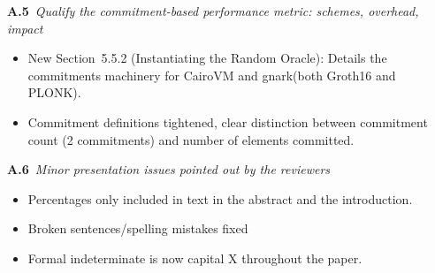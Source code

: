 \documentclass[10pt,a4paper]{article}
\newcommand{\req}[2][]{\begin{reqbox}\textbf{#1}\itshape\ #2\end{reqbox}}
\begin{document}
\req[A.5]{Qualify the commitment-based performance metric: schemes, overhead, impact}
\begin{itemize}
\item New Section~5.5.2 (Instantiating the Random Oracle): Details the commitments machinery for CairoVM and gnark(both Groth16 and PLONK).
\item Commitment definitions tightened, clear distinction between commitment count (2 commitments) and number of elements committed.
\end{itemize}

\req[A.6]{Minor presentation issues pointed out by the reviewers}
\begin{itemize}
\item Percentages only included in text in the abstract and the introduction.
\item Broken sentences/spelling mistakes fixed
\item Formal indeterminate is now capital X throughout the paper.
\end{itemize}
\end{document}
